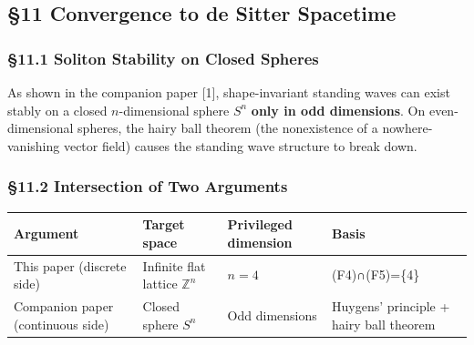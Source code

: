 \documentclass[
  a4paper,11pt]{article}
\newcounter{none}
\theoremstyle{definition}
\theoremstyle{remark}
\begin{document}
\subsection{§11 Convergence to de Sitter
Spacetime}\label{convergence-to-de-sitter-spacetime}

\subsubsection{§11.1 Soliton Stability on Closed
Spheres}\label{soliton-stability-on-closed-spheres}

As shown in the companion paper {[}1{]}, shape-invariant standing waves
can exist stably on a closed \(n\)-dimensional sphere \(S^n\)
\textbf{only in odd dimensions}. On even-dimensional spheres, the hairy
ball theorem (the nonexistence of a nowhere-vanishing vector field)
causes the standing wave structure to break down.

\subsubsection{§11.2 Intersection of Two
Arguments}\label{intersection-of-two-arguments}

{\def\LTcaptype{none} %
\begin{longtable}[]{@{}
  >{\raggedright\arraybackslash}p{}
  >{\raggedright\arraybackslash}p{}
  >{\raggedright\arraybackslash}p{}
  >{\raggedright\arraybackslash}p{}@{}}
\toprule\noalign{}
\begin{minipage}[b]{\linewidth}\raggedright
Argument
\end{minipage} & \begin{minipage}[b]{\linewidth}\raggedright
Target space
\end{minipage} & \begin{minipage}[b]{\linewidth}\raggedright
Privileged dimension
\end{minipage} & \begin{minipage}[b]{\linewidth}\raggedright
Basis
\end{minipage} \\
\midrule\noalign{}
\endhead
\bottomrule\noalign{}
\endlastfoot
This paper (discrete side) & Infinite flat lattice \(\mathbb{Z}^n\) &
\(n = 4\) & (F4)∩(F5)=\{4\} \\
Companion paper (continuous side) & Closed sphere \(S^n\) & Odd
dimensions & Huygens' principle + hairy ball theorem \\
\end{longtable}
}
\end{document}
